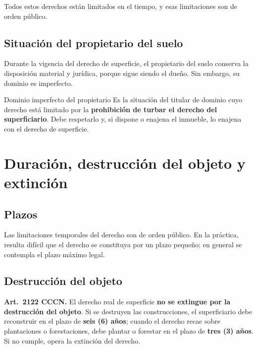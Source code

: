 \documentclass[12pt,oneside]{book}
\begin{document}
\begin{important}
Todos estos derechos están limitados en el tiempo, y esas limitaciones son de orden público.
\end{important}

\section{Situación del propietario del suelo}

Durante la vigencia del derecho de superficie, el propietario del suelo conserva la disposición material y jurídica, porque sigue siendo el dueño. Sin embargo, su dominio es imperfecto.

\begin{definition}{Dominio imperfecto del propietario}
Es la situación del titular de dominio cuyo derecho está limitado por la \textbf{prohibición de turbar el derecho del superficiario}. Debe respetarlo y, si dispone o enajena el inmueble, lo enajena con el derecho de superficie.
\end{definition}

\chapter[Duración y extinción]{Duración, destrucción del objeto y extinción}

\section{Plazos}

Las limitaciones temporales del derecho son de orden público. En la práctica, resulta difícil que el derecho se constituya por un plazo pequeño; en general se contempla el plazo máximo legal.

\section{Destrucción del objeto}

\begin{important}
\textbf{Art.~2122 CCCN.} El derecho real de superficie \textbf{no se extingue por la destrucción del objeto}. Si se destruyen las construcciones, el superficiario debe reconstruir en el plazo de \textbf{seis (6) años}; cuando el derecho recae sobre plantaciones o forestaciones, debe plantar o forestar en el plazo de \textbf{tres (3) años}. Si no cumple, opera la extinción del derecho.
\end{important}
\end{document}
